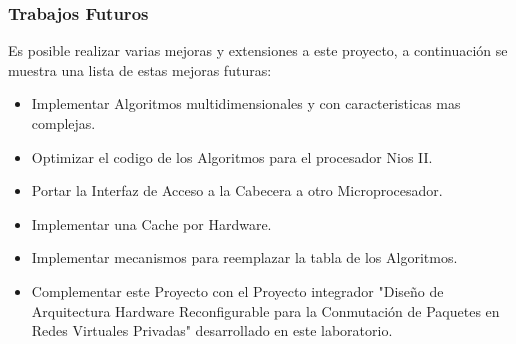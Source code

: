 \subsubsection{Trabajos Futuros}

Es posible realizar varias mejoras y extensiones a este proyecto, a continuación se muestra una lista de estas mejoras futuras:

\begin{itemize}
	\item Implementar Algoritmos multidimensionales y con caracteristicas mas complejas.
	\item Optimizar el codigo de los Algoritmos para el procesador Nios II. 
	\item Portar la Interfaz de Acceso a la Cabecera a otro Microprocesador.
	\item Implementar una Cache por Hardware.
	\item Implementar mecanismos para reemplazar la tabla de los Algoritmos.
	\item Complementar este Proyecto con el Proyecto integrador "Diseño de Arquitectura Hardware Reconfigurable para la Conmutación de Paquetes en Redes Virtuales Privadas"\cite{spaz} desarrollado en este laboratorio.
\end{itemize}






